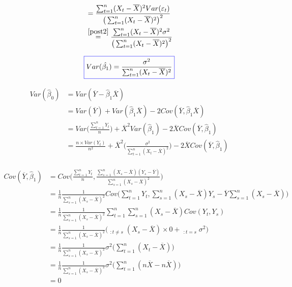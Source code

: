 \documentclass[11pt,french]{report}
\begin{document}
\begin{align*}
&= \frac{\sum_{t=1}^n(X_t- \overline{X})^2 Var(\varepsilon_t)}{\big( \sum_{t=1}^n(X_t - \overline{X})^2 \big)^2} \\
& \overset{\ref{post2}}{=} \frac{\sum_{t=1}^n(X_t- \overline{X})^2 \sigma^2}{\big( \sum_{t=1}^n(X_t - \overline{X})^2 \big)^2} \\
\end{align*}

\begin{equation}
\label{eq:varbeta1}
\color{blue}
\boxed{\color{black}
Var(\hat{\beta_1}) = \frac{\sigma^2}{\sum_{t=1}^n(X_t - \overline{X})^2}}
\end{equation}

\begin{align*}
Var(\hat{\beta}_0) &= Var(\overline{Y} - \hat{\beta}_1\overline{X})\\
&= Var(\overline{Y}) + Var(\hat{\beta}_1\overline{X}) -  2 Cov(\overline{Y}, \hat{\beta}_1\overline{X}) \\
&= Var\Big(\frac{\sum_{t=1}^n Y_t}{n} \Big) + \overline{X}^2 Var(\hat{\beta}_1) -  2 \overline{X} Cov(\overline{Y}, \hat{\beta}_1) \\
&= \frac{n \times Var(Y_t)}{n^2}  + \overline{X}^2 \Bigg(\frac{\sigma^2}{\sum_{t=1}^n (X_t - \overline{X})^2}\Bigg) -  2 \overline{X} Cov(\overline{Y}, \hat{\beta}_1) \\
\end{align*}

\begin{align*}
Cov(\overline{Y}, \hat{\beta}_1) &= Cov \Bigg( \frac{\sum_{t=1}^n Y_t}{n}, \frac{\sum_{s=1}^n(X_s- \overline{X})(Y_s - \overline{Y})}{\sum_{s=1}^n(X_s - \overline{X})^2} \Bigg) \\
&= \frac{1}{n}\frac{1}{\sum_{s=1}^n(X_s - \overline{X})^2} Cov\Bigg(\sum_{t=1}^n Y_t, \sum_{s=1}^n(X_s- \overline{X})Y_s - \overline{Y}\sum_{s=1}^n(X_s- \overline{X}) \Bigg) \\
&= \frac{1}{n}\frac{1}{\sum_{s=1}^n(X_s - \overline{X})^2} \sum_{t=1}^n \sum_{s=1}^n (X_s- \overline{X}) Cov(Y_t, Y_s) \\
&= \frac{1}{n}\frac{1}{\sum_{s=1}^n(X_s - \overline{X})^2} \Bigg( \mathop{\sum_{t=1}^n \sum_{s=1}^n}_{:t \neq s} (X_s- \overline{X}) \times 0 + \mathop{\sum_{t=1}^n \sum_{s=1}^n}_{:t = s} \sigma^2 \Bigg) \\
&= \frac{1}{n}\frac{1}{\sum_{s=1}^n(X_s - \overline{X})^2}\sigma^2 \bigg( \sum_{t=1}^n (X_t - \overline{X}) \bigg) \\
&= \frac{1}{n}\frac{1}{\sum_{s=1}^n(X_s - \overline{X})^2}\sigma^2 \bigg( \sum_{t=1}^n (n\overline{X}- n\overline{X}) \bigg) \\
&= 0
\end{align*}
\end{document}
